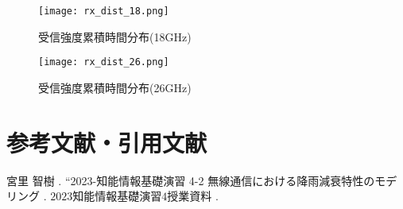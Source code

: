 \documentclass[a4paper, 11pt, titlepage]{jsarticle}
\begin{document}
\begin{figure}[H]
	\centering
	\texttt{[image: rx\_dist\_18.png]}
	\caption{受信強度累積時間分布(18GHz)}
	\label{fig:rx_dist_18}
\end{figure}

\begin{figure}[H]
	\centering
	\texttt{[image: rx\_dist\_26.png]}
	\caption{受信強度累積時間分布(26GHz)}
	\label{fig:rx_dist_26}
\end{figure}

\section*{参考文献・引用文献}

\begin{thebibliography}{99}
 宮里 智樹 . “2023-知能情報基礎演習 4-2 無線通信における降雨減衰特性のモデリング . $2023 知能情報基礎演習4 授業資料$ .
\end{thebibliography}
\end{document}
